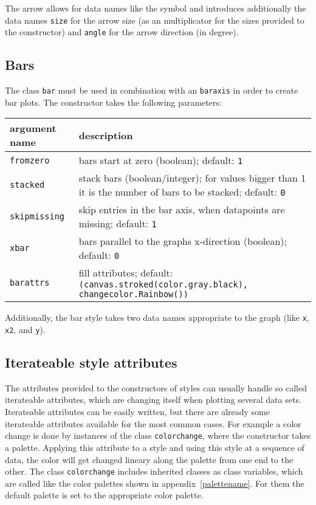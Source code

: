 The arrow allows for data names like the symbol and introduces
additionally the data names \verb|size| for the arrow size (as an
multiplicator for the sizes provided to the constructor) and
\verb|angle| for the arrow direction (in degree).

\subsection{Bars}

The class \verb|bar| must be used in combination with an
\verb|baraxis| in order to create bar plots. The constructor takes the
following parameters:

\medskip
\begin{tabularx}{\linewidth}{l>{\raggedright\arraybackslash}X}
argument name&description\\
\hline
\texttt{fromzero}&bars start at zero (boolean); default: \texttt{1}\\
\texttt{stacked}&stack bars (boolean/integer); for values bigger than 1 it is the number of bars to be stacked; default: \texttt{0}\\
\texttt{skipmissing}&skip entries in the bar axis, when datapoints are missing; default: \texttt{1}\\
\texttt{xbar}&bars parallel to the graphs x-direction (boolean); default: \texttt{0}\\
\texttt{barattrs}&fill attributes; default: \texttt{(canvas.stroked(color.gray.black), changecolor.Rainbow())}\\
\end{tabularx}

Additionally, the bar style takes two data names appropriate to the
graph (like \verb|x|, \verb|x2|, and \verb|y|).

\subsection{Iterateable style attributes}
\label{graph:changeattrs}

The attributes provided to the constructors of styles can usually
handle so called iterateable attributes, which are changing itself
when plotting several data sets. Iterateable attributes can be easily
written, but there are already some iterateable attributes available
for the most common cases. For example a color change is done by
instances of the class \verb|colorchange|, where the constructor takes
a palette. Applying this attribute to a style and using this style at
a sequence of data, the color will get changed lineary along the
palette from one end to the other. The class \verb|colorchange|
includes inherited classes as class variables, which are called like
the color palettes shown in appendix~\ref{palettename}. For them the
default palette is set to the appropriate color palette.

